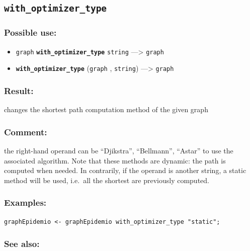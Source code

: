 \documentclass[]{book}
\providecommand{\tightlist}{%
  \setlength{\itemsep}{0pt}\setlength{\parskip}{0pt}}
\theoremstyle{definition}
\theoremstyle{definition}
\theoremstyle{definition}
\theoremstyle{remark}
\begin{document}
\subsection{\texorpdfstring{\texttt{with\_optimizer\_type}}{with\_optimizer\_type}}\label{with_optimizer_type}

\subsubsection{Possible use:}\label{possible-use-559}

\begin{itemize}
\tightlist
\item
  \texttt{graph} \textbf{\texttt{with\_optimizer\_type}} \texttt{string}
  ---\textgreater{} \texttt{graph}
\item
  \textbf{\texttt{with\_optimizer\_type}} (\texttt{graph} ,
  \texttt{string}) ---\textgreater{} \texttt{graph}
\end{itemize}

\subsubsection{Result:}\label{result-538}

changes the shortest path computation method of the given graph

\subsubsection{Comment:}\label{comment-111}

the right-hand operand can be ``Djikstra'', ``Bellmann'', ``Astar'' to
use the associated algorithm. Note that these methods are dynamic: the
path is computed when needed. In contrarily, if the operand is another
string, a static method will be used, i.e.~all the shortest are
previously computed.

\subsubsection{Examples:}\label{examples-386}

\begin{verbatim}
graphEpidemio <- graphEpidemio with_optimizer_type "static"; 
\end{verbatim}

\subsubsection{See also:}\label{see-also-223}
\end{document}
